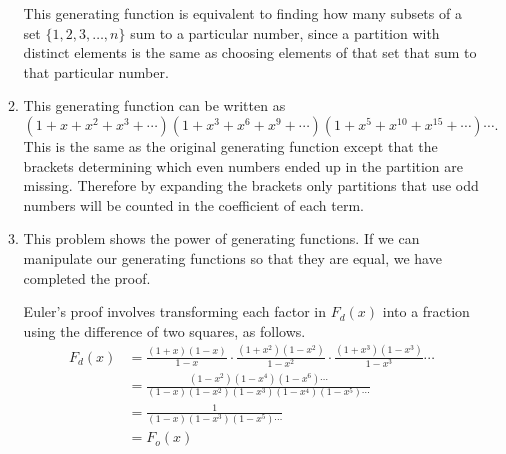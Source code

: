 \documentclass[a4paper,10pt]{article}
\begin{document}
\begin{enumerate}
\begin{enumerate}
          This generating function is equivalent to finding how many subsets
          of a set \(\{1,2,3,\ldots,n\}\) sum to a particular number, since
          a partition with distinct elements is the same as choosing elements
          of that set that sum to that particular number.
        \item This generating function can be written as
          \[(1+x+x^2+x^3+\cdots)(1+x^3+x^6+x^9+\cdots)(1+x^5+x^{10}+x^{15}+\cdots)\cdots.\]
          This is the same as the original generating function except
          that the brackets determining which even numbers ended up
          in the partition are missing. Therefore by expanding the brackets
          only partitions that use odd numbers will be counted in the coefficient of each term.
        \item This problem shows the power of generating functions. If we
          can manipulate our generating functions so that they are equal,
          we have completed the proof.

          Euler's proof involves transforming each factor in \(F_d(x)\) into
          a fraction using the difference of two squares, as follows.
          \[
            \begin{split}
              F_d(x)&=\frac{(1+x)(1-x)}{1-x}\cdot\frac{(1+x^2)(1-x^2)}{1-x^2}\cdot\frac{(1+x^3)(1-x^3)}{1-x^3}\cdots\\
                    &=\frac{(1-x^2)(1-x^4)(1-x^6)\cdots}{(1-x)(1-x^2)(1-x^3)(1-x^4)(1-x^5)\cdots}\\
                    &=\frac{1}{(1-x)(1-x^3)(1-x^5)\cdots}\\
              &=F_o(x)
            \end{split}
            \]
        \end{enumerate}
\end{enumerate}
\end{document}
